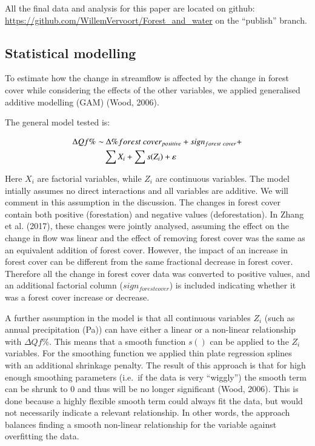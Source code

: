 \documentclass[]{elsarticle} %
\begin{document}
All the final data and analysis for this paper are located on github: \href{https://github.com/WillemVervoort/Forest_and_water/tree/publish}{https://github.com/WillemVervoort/Forest\_and\_water} on the ``publish'' branch.

\hypertarget{statistical-modelling}{%
\subsection{Statistical modelling}\label{statistical-modelling}}

To estimate how the change in streamflow is affected by the change in forest cover while considering the effects of the other variables, we applied generalised additive modelling (GAM) (Wood, 2006).

The general model tested is:

\begin{align}
\Delta Qf \% \sim &~ \Delta \% forest~cover_{positive} + sign_{forest~cover} + \notag \\ 
& \sum{X_i} + \sum{s(Z_i)} + \varepsilon \label{eq:eq2}
\end{align}

Here \(X_i\) are factorial variables, while \(Z_i\) are continuous variables. The model intially assumes no direct interactions and all variables are additive. We will comment in this assumption in the discussion. The changes in forest cover contain both positive (forestation) and negative values (deforestation). In Zhang et al. (2017), these changes were jointly analysed, assuming the effect on the change in flow was linear and the effect of removing forest cover was the same as an equivalent addition of forest cover. However, the impact of an increase in forest cover can be different from the same fractional decrease in forest cover. Therefore all the change in forest cover data was converted to positive values, and an additional factorial column (\(sign_{forest cover}\)) is included indicating whether it was a forest cover increase or decrease.

A further assumption in the model is that all continuous variables \(Z_i\) (such as annual precipitation (Pa)) can have either a linear or a non-linear relationship with \(\Delta Qf \%\). This means that a smooth function \(s()\) can be applied to the \(Z_i\) variables. For the smoothing function we applied thin plate regression splines with an additional shrinkage penalty. The result of this approach is that for high enough smoothing parameters (i.e.~if the data is very ``wiggly'') the smooth term can be shrunk to 0 and thus will be no longer significant (Wood, 2006). This is done because a highly flexible smooth term could always fit the data, but would not necessarily indicate a relevant relationship. In other words, the approach balances finding a smooth non-linear relationship for the variable against overfitting the data.
\end{document}
